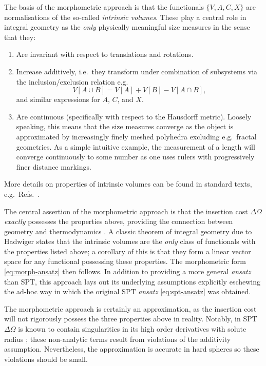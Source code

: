 The basis of the morphometric approach is that the functionals $\{V,A,C,X\}$ are normalisations of the so-called \emph{intrinsic volumes}.
These play a central role in integral geometry as the \emph{only} physically meaningful size measures in the sense that they:
\begin{enumerate}
\item Are invariant with respect to translations and rotations.
\item Increase additively, i.e.\ they transform under combination of subsystems via the inclusion/exclusion relation e.g.\
  \begin{equation*}\label{eq:additivity}
    V[A \cup B] = V[A] + V[B] - V[A \cap B],
  \end{equation*}
  and similar expressions for $A$, $C$, and $X$.
\item Are continuous (specifically with respect to the Hausdorff metric).
  Loosely speaking, this means that the size measures converge as the object is approximated by increasingly finely meshed polyhedra excluding e.g.\ fractal geometries.
  As a simple intuitive example, the measurement of a length will converge continuously to some number as one uses rulers with progressively finer distance markings.
\end{enumerate}
More details on properties of intrinsic volumes can be found in standard texts, e.g.\ Refs.\ \cite{Santalo2004,Klain1997}.

The central assertion of the morphometric approach is that the insertion cost $\Delta \Omega$ \emph{exactly} possesses the properties above, providing the connection between geometry and thermodynamics \cite{KonigPRL2004}.
A classic theorem of integral geometry due to Hadwiger \cite{Hadwiger1957} states that the intrinsic volumes are the \emph{only} class of functionals with the properties listed above; a corollary of this is that they form a linear vector space for any functional possessing these properties.
The morphometric form \eqref{eq:morph-ansatz} then follows.
In addition to providing a more general \emph{ansatz} than SPT, this approach lays out its underlying assumptions explicitly eschewing the ad-hoc way in which the original SPT \emph{ansatz} \eqref{eq:spt-ansatz} was obtained.

The morphometric approach is certainly an approximation, as the insertion cost will not rigorously possess the three properties above in reality.
Notably, in SPT $\Delta\Omega$ is known to contain singularities in its high order derivatives with solute radius \cite{ReissJCP1959}; these non-analytic terms result from violations of the additivity assumption.
Nevertheless, the approximation is accurate in hard spheres \cite{OettelEL2009,AshtonPRE2011,LairdPRE2012,BlokhuisPRE2013,UrrutiaPRE2014,Hansen-GoosJCP2014} so these violations should be small.

